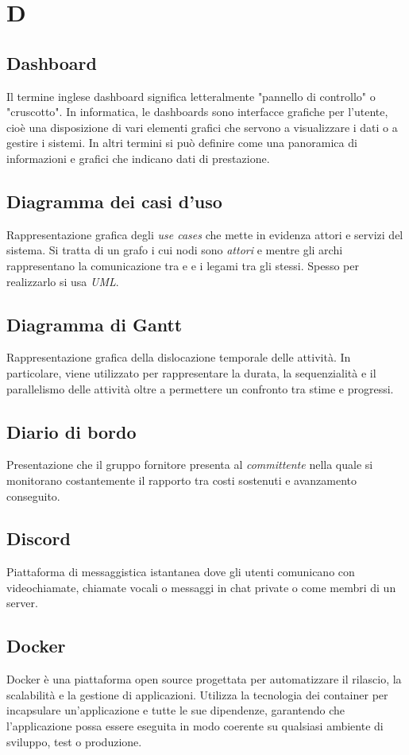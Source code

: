 \chapter{D}


\section{Dashboard}
Il termine inglese dashboard significa letteralmente "pannello di controllo" o "cruscotto". In informatica, le dashboards sono interfacce grafiche per l'utente, cioè una disposizione di vari elementi grafici che servono a visualizzare i dati o a gestire i sistemi. In altri termini si può definire come una panoramica di informazioni e grafici che indicano dati di prestazione.

\section{Diagramma dei casi d'uso}\label{sec:Diagrammi dei casi d'uso}
Rappresentazione grafica degli \emph{use cases} che mette in evidenza attori e servizi del sistema. Si tratta di un grafo i cui nodi sono \emph{attori} e  mentre gli archi rappresentano la comunicazione tra  e  e i legami tra gli  stessi. Spesso per realizzarlo si usa \emph{UML}.

\section{Diagramma di Gantt}\label{sec:Diagrammi di Gantt}
Rappresentazione grafica della dislocazione temporale delle attività. In particolare, viene utilizzato per rappresentare la durata, la sequenzialità e il parallelismo delle attività oltre a permettere un confronto tra stime e progressi.

\section{Diario di bordo}\label{sec:Diari di bordo}
Presentazione che il gruppo fornitore presenta al \emph{committente} nella quale si monitorano costantemente il rapporto tra costi sostenuti e avanzamento conseguito.

\section{Discord}
Piattaforma di messaggistica istantanea dove gli utenti comunicano con videochiamate, chiamate vocali o messaggi in chat private o come membri di un server.

\section{Docker}
Docker è una piattaforma open source progettata per automatizzare il rilascio, la scalabilità e la gestione di applicazioni. Utilizza la tecnologia dei container per incapsulare un'applicazione e tutte le sue dipendenze, garantendo che l'applicazione possa essere eseguita in modo coerente su qualsiasi ambiente di sviluppo, test o produzione.
